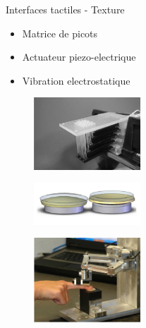 \documentclass[compress, noflama]{beamer}
\begin{document}
\begin{frame}{Interfaces tactiles - Texture}
\begin{multicols}{2}

\begin{itemize}
\item Matrice de picots
\item Actuateur piezo-electrique
\item Vibration electrostatique
\end{itemize}

\begin{figure}
\centering
\includegraphics[width=4cm]{images/texture}
\caption{\cite{Yang2008}}
\end{figure}

\begin{figure}
\centering
\includegraphics[width=4cm]{images/piezo}
\end{figure}

\begin{figure}
\centering
\includegraphics[width=4cm]{images/piezo2}
\caption{\cite{Winfield2007}}
\end{figure}

\end{multicols}




\end{frame}
\end{document}
